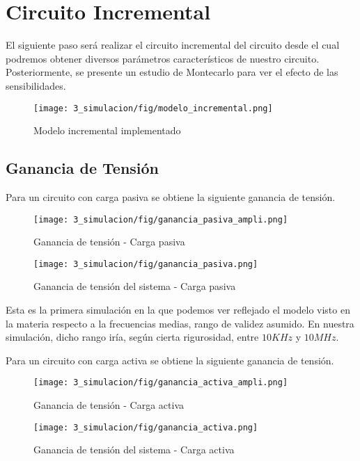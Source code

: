 \section{Circuito Incremental}
El siguiente paso será realizar el circuito incremental del circuito desde el cual podremos obtener diversos parámetros 
característicos de nuestro circuito. Posteriormente, se presente un estudio de Montecarlo para ver el efecto de 
las sensibilidades.

\begin{figure}[H]
    \centering
    \texttt{[image: 3\_simulacion/fig/modelo\_incremental.png]}
    \label{mediciones_pol_activa}
    \caption{Modelo incremental implementado}
\end{figure}

\subsection{Ganancia de Tensión}

Para un circuito con carga pasiva se obtiene la siguiente ganancia de tensión.

\begin{figure}[H]
    \centering
    \texttt{[image: 3\_simulacion/fig/ganancia\_pasiva\_ampli.png]}
    \label{mediciones_pol_activa}
    \caption{Ganancia de tensión -  Carga pasiva}
\end{figure}

\begin{figure}[H]
    \centering
    \texttt{[image: 3\_simulacion/fig/ganancia\_pasiva.png]}
    \label{mediciones_pol_activa}
    \caption{Ganancia de tensión del sistema -  Carga pasiva}
\end{figure}

Esta es la primera simulación en la que podemos ver reflejado el modelo visto en 
la materia respecto a la frecuencias medias, rango de validez asumido. En nuestra simulación,
dicho rango iría, según cierta rigurosidad, entre $10 KHz$ y $10 MHz$.

Para un circuito con carga activa se obtiene la siguiente ganancia de tensión.

\begin{figure}[H]
    \centering
    \texttt{[image: 3\_simulacion/fig/ganancia\_activa\_ampli.png]}
    \label{mediciones_pol_activa}
    \caption{Ganancia de tensión -  Carga activa}
\end{figure}

\begin{figure}[H]
    \centering
    \texttt{[image: 3\_simulacion/fig/ganancia\_activa.png]}
    \label{mediciones_pol_activa}
    \caption{Ganancia de tensión del sistema -  Carga activa}
\end{figure}


